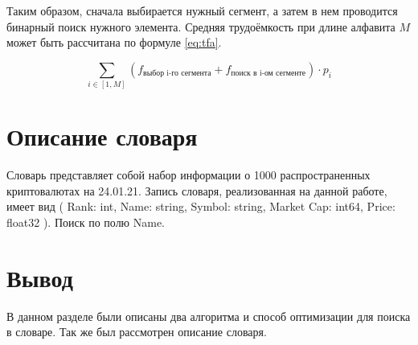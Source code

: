 Таким образом, сначала выбирается нужный сегмент, а затем в нем проводится бинарный поиск нужного элемента. Средняя трудоёмкость при длине алфавита $M$ может быть рассчитана по формуле \ref{eq:tfa}. 

\begin{equation} \label{eq:tfa}
	\sum\limits_{i\in[1, M]} (f_{\text{выбор i-го сегмента}}+f_{\text{поиск в i-ом сегменте}}) \cdot p_i
\end{equation}


\section{Описание словаря}

Словарь представляет собой набор информации о 1000 распространенных криптовалютах на 24.01.21.
Запись словаря, реализованная на данной работе, имеет вид
( Rank: int, Name: string, Symbol: string, Market Cap: int64, Price: float32 ).
Поиск по полю Name.

\section{Вывод}
В данном разделе были описаны два алгоритма и способ оптимизации для поиска в словаре.
Так же был рассмотрен описание словаря.